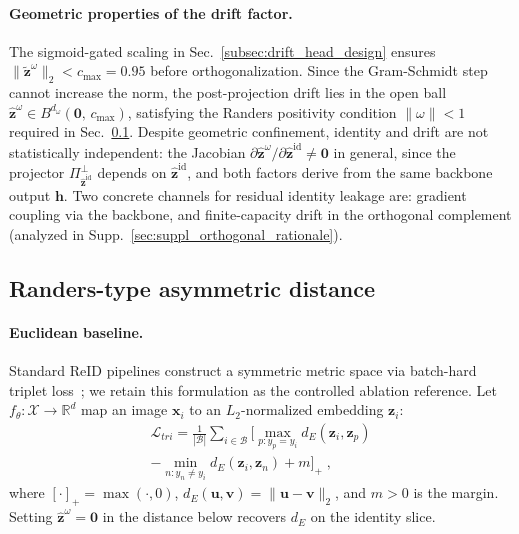 \paragraph{Geometric properties of the drift factor.} The sigmoid-gated scaling in Sec.~\ref{subsec:drift_head_design} ensures $\|\tilde{\mathbf{z}}^{\omega}\|_2 < c_{\max} = 0.95$ before orthogonalization. Since the Gram-Schmidt step cannot increase the norm, the post-projection drift lies in the open ball $\hat{\mathbf{z}}^{\omega} \in B^{d_\omega}(\mathbf{0},\, c_{\max})$, satisfying the Randers positivity condition $\|\omega\| < 1$ required in Sec.~\ref{subsec:asymmetric_finsler_distance}. Despite geometric confinement, identity and drift are not statistically independent: the Jacobian $\partial\hat{\mathbf{z}}^{\omega}/\partial\hat{\mathbf{z}}^{\mathrm{id}} \neq \mathbf{0}$ in general, since the projector $\Pi_{\hat{\mathbf{z}}^{\mathrm{id}}}^{\perp}$ depends on $\hat{\mathbf{z}}^{\mathrm{id}}$, and both factors derive from the same backbone output $\mathbf{h}$. Two concrete channels for residual identity leakage are: gradient coupling via the backbone, and finite-capacity drift in the orthogonal complement (analyzed in Supp.~\ref{sec:suppl_orthogonal_rationale}).

\subsection{Randers-type asymmetric distance} \label{subsec:asymmetric_finsler_distance}
\paragraph{Euclidean baseline.}
Standard ReID pipelines construct a symmetric metric space via batch-hard triplet loss~\cite{hermans2017defense}; we retain this formulation as the controlled ablation reference. Let $f_\theta : \mathcal{X} \rightarrow \mathbb{R}^d$ map an image $\mathbf{x}_i$ to an $L_2$-normalized embedding $\mathbf{z}_i$:
\begin{multline}
\mathcal{L}_{tri} = \frac{1}{|\mathcal{B}|} \sum_{i \in \mathcal{B}} \Bigg[ \max_{p:y_p=y_i} d_E(\mathbf{z}_i, \mathbf{z}_p) \\
- \min_{n:y_n \neq y_i} d_E(\mathbf{z}_i, \mathbf{z}_n) + m \Bigg]_+ \; ,
\label{eq:euclidean_triplet}
\end{multline}
where $[\cdot]_+{=}\max(\cdot,0)$, $d_E(\mathbf{u}, \mathbf{v}) = \|\mathbf{u} - \mathbf{v}\|_2$, and $m{>}0$ is the margin. Setting $\hat{\mathbf{z}}^{\omega}{=}\mathbf{0}$ in the distance below recovers $d_E$ on the identity slice.

